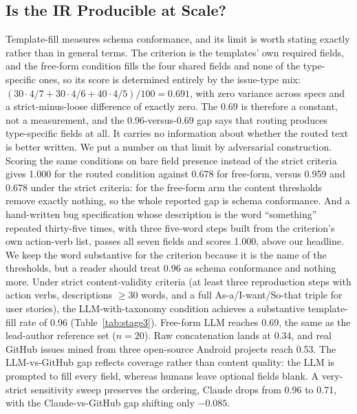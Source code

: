 \documentclass[sigconf, anonymous]{acmart}
\begin{document}
\subsection{Is the IR Producible at Scale?}\label{exp1-results}

Template-fill measures schema conformance, and its limit is worth stating exactly rather than
in general terms. The criterion is the templates' own required fields, and the free-form
condition fills the four shared fields and none of the type-specific ones, so its score is
determined entirely by the issue-type mix: $(30 \cdot 4/7 + 30 \cdot 4/6 + 40 \cdot 4/5)/100 =
0.691$, with zero variance across specs and a strict-minus-loose difference of exactly zero. The
0.69 is therefore a constant, not a measurement, and the 0.96-versus-0.69 gap says that routing
produces type-specific fields at all. It carries no information about whether the routed text is
better written. We put a number on that limit by adversarial construction. Scoring the same
conditions on bare field presence instead of the strict criteria gives 1.000 for the routed
condition against 0.678 for free-form, versus 0.959 and 0.678 under the strict criteria: for the
free-form arm the content thresholds remove exactly nothing, so the whole reported gap is schema
conformance. And a hand-written bug specification whose description is the word ``something''
repeated thirty-five times, with three five-word steps built from the criterion's own action-verb
list, passes all seven fields and scores 1.000, above our headline. We keep the word substantive
for the criterion because it is the name of the thresholds, but a reader should treat 0.96 as
schema conformance and nothing more. Under strict content-validity criteria (at
least three reproduction steps with action verbs, descriptions $\geq 30$ words, and a full
As-a/I-want/So-that triple for user stories), the LLM-with-taxonomy condition achieves a
substantive template-fill rate of 0.96 (Table~\ref{tab:stage3}). Free-form LLM reaches 0.69, the same as the lead-author reference set ($n=20$). Raw concatenation lands at 0.34, and real GitHub issues mined from three open-source Android projects reach 0.53. The LLM-vs-GitHub gap reflects coverage rather than content quality: the LLM is prompted to fill every field, whereas humans leave optional fields blank. A very-strict sensitivity sweep preserves the ordering, Claude drops from 0.96 to 0.71, with the Claude-vs-GitHub gap shifting only $-0.085$.
\end{document}
